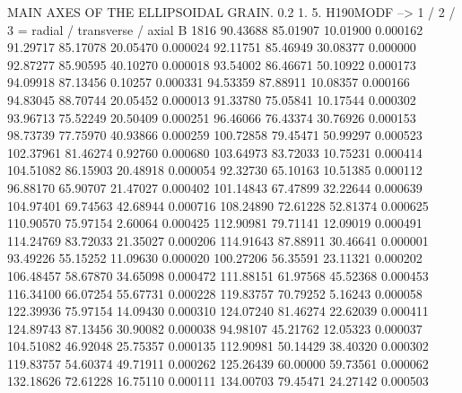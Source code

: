     MAIN AXES OF THE ELLIPSOIDAL GRAIN.
    0.2   1.     5.
    H190MODF   --> 1 / 2 / 3 = radial / transverse / axial
B    1816
       90.43688       85.01907       10.01900       0.000162
       91.29717       85.17078       20.05470       0.000024
       92.11751       85.46949       30.08377       0.000000
       92.87277       85.90595       40.10270       0.000018
       93.54002       86.46671       50.10922       0.000173
       94.09918       87.13456        0.10257       0.000331
       94.53359       87.88911       10.08357       0.000166
       94.83045       88.70744       20.05452       0.000013
       91.33780       75.05841       10.17544       0.000302
       93.96713       75.52249       20.50409       0.000251
       96.46066       76.43374       30.76926       0.000153
       98.73739       77.75970       40.93866       0.000259
      100.72858       79.45471       50.99297       0.000523
      102.37961       81.46274        0.92760       0.000680
      103.64973       83.72033       10.75231       0.000414
      104.51082       86.15903       20.48918       0.000054
       92.32730       65.10163       10.51385       0.000112
       96.88170       65.90707       21.47027       0.000402
      101.14843       67.47899       32.22644       0.000639
      104.97401       69.74563       42.68944       0.000716
      108.24890       72.61228       52.81374       0.000625
      110.90570       75.97154        2.60064       0.000425
      112.90981       79.71141       12.09019       0.000491
      114.24769       83.72033       21.35027       0.000206
      114.91643       87.88911       30.46641       0.000001
       93.49226       55.15252       11.09630       0.000020
      100.27206       56.35591       23.11321       0.000202
      106.48457       58.67870       34.65098       0.000472
      111.88151       61.97568       45.52368       0.000453
      116.34100       66.07254       55.67731       0.000228
      119.83757       70.79252        5.16243       0.000058
      122.39936       75.97154       14.09430       0.000310
      124.07240       81.46274       22.62039       0.000411
      124.89743       87.13456       30.90082       0.000038
       94.98107       45.21762       12.05323       0.000037
      104.51082       46.92048       25.75357       0.000135
      112.90981       50.14429       38.40320       0.000302
      119.83757       54.60374       49.71911       0.000262
      125.26439       60.00000       59.73561       0.000062
      132.18626       72.61228       16.75110       0.000111
      134.00703       79.45471       24.27142       0.000503
